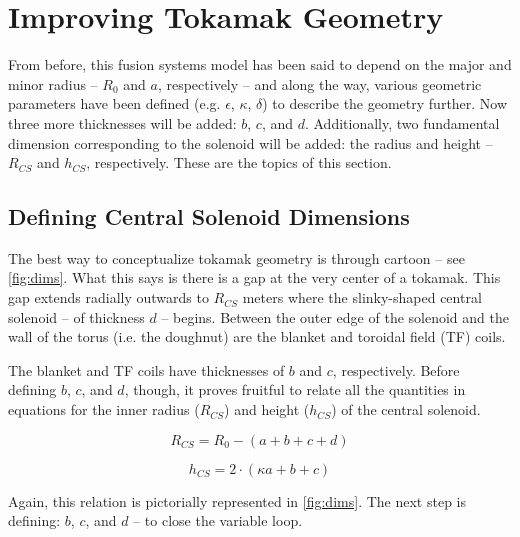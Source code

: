 \section{Improving Tokamak Geometry}

From before, this fusion systems model has been said to depend on the major and minor radius -- $R_0$ and $a$, respectively -- and along the way, various geometric parameters have been defined (e.g. $\epsilon$, $\kappa$, $\delta$) to describe the geometry further. Now three more thicknesses will be added: $b$, $c$, and $d$. Additionally, two fundamental dimension corresponding to the solenoid will be added: the radius and height -- $R_{CS}$ and $h_{CS}$, respectively. These are the topics of this section.

\subsection{Defining Central Solenoid Dimensions}

The best way to conceptualize tokamak geometry is through cartoon -- see \cref{fig:dims}. What this says is there is a gap at the very center of a tokamak. This gap extends radially outwards to $R_{CS}$ meters where the slinky-shaped central solenoid -- of thickness $d$ -- begins. Between the outer edge of the solenoid and the wall of the torus (i.e. the doughnut) are the blanket and toroidal field (TF) coils.

\begin{figure*}
\centering

\caption{Dimensions of Tokamak Cross-Section}
\label{fig:dims}
\end{figure*}

The blanket and TF coils have thicknesses of $b$ and $c$, respectively. Before defining $b$, $c$, and $d$, though, it proves fruitful to relate all the quantities in equations for the inner radius ($R_{CS}$) and height ($h_{CS}$) of the central solenoid.
 
 \begin{equation}
 	\label{eq:rcs1}
 	R_{CS} = R_0 - ( a + b + c + d )
 \end{equation}
 
 \begin{equation}
	\label{eq:hcs1}
 	h_{CS} = 2 \cdot \left ( \kappa a + b + c \right)
 \end{equation}

Again, this relation is pictorially represented in \cref{fig:dims}. The next step is defining: $b$, $c$, and $d$ -- to close the variable loop.

